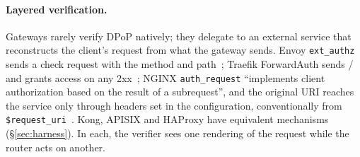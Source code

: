 \paragraph{Layered verification.} Gateways rarely verify DPoP natively; they
delegate to an external service that reconstructs the client's request from
what the gateway sends. Envoy \texttt{ext\_authz} sends a check request with
the method and path~\cite{w2:envoyextauthz}; Traefik ForwardAuth sends
/ and grants access on any
2xx~\cite{w2:traefikfwdauth}; NGINX \texttt{auth\_request} ``implements client
authorization based on the result of a subrequest'', and the original URI
reaches the service only through headers set in the configuration,
conventionally  from
\texttt{\$request\_uri}~\cite{w2:nginxauthreq}. Kong, APISIX and HAProxy have
equivalent mechanisms (\S\ref{sec:harness}). In each, the verifier sees one
rendering of the request while the router acts on another.
